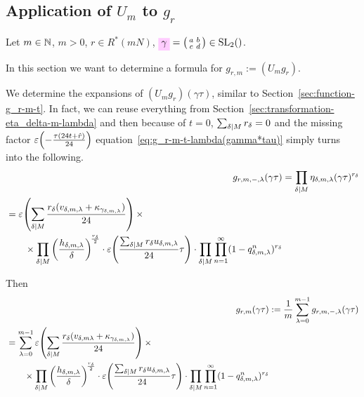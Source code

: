 \documentclass{article}
\begin{document}
\subsection{Application of $U_m$ to $g_{r}$}

Let $m \in \mathbb{N}$, $m>0$, $r \in R^*(mN)$,
$\defineNotation[gamma]{\gamma} =
\left(\begin{smallmatrix}a&b\\c&d\end{smallmatrix}\right) \in
\SL2Z$.
%

In this section we want to determine a formula for
$g_{r,m} := (U_m g_r)$.

We determine the expansions of $(U_m g_r)(\gamma\tau)$, similar to
Section~\ref{sec:function-g_r-m-t}.
%
In fact, we can reuse everything from
Section~\ref{sec:transformation-eta_delta-m-lambda} and then because
of $t=0$, $\sum_{\delta \mid M} r_\delta=0$ and the missing factor
$\varepsilon\!\left(-\frac{\tau(24t+\hat{r})}{24}\right)$
equation~\eqref{eq:g_r-m-t-lambda(gamma*tau)} simply turns into the
following.
\begin{align}
  g_{r,m,-,\lambda}(\gamma\tau)
  &=
    \prod_{\delta \mid M}
    \eta_{\delta,m,\lambda}(\gamma\tau)^{r_\delta}\notag\\
  \begin{split}
  &=
  \varepsilon\!\left(
      \sum_{\delta \mid M}\frac{r_\delta(v_{\delta,m,\lambda}
        +
      \kappa_{\gamma_{\delta,m,\lambda}})}{24}\right) \times\\
  & \qquad\times
    \prod_{\delta \mid M}
    \left(\frac{h_{\delta,m,\lambda}}{\delta}\right)^{\!\frac{r_\delta}{2}}
    \cdot
    \varepsilon\!\left(\frac{\sum_{\delta \mid M} r_\delta u_{\delta,m,\lambda}}{24} \tau\right)
    \cdot
    \prod_{\delta \mid M}
    \prod_{n=1}^\infty (1-q_{\delta,m,\lambda}^n)^{r_\delta}
  \end{split}
  \label{eq:g_r-m---lambda(gamma*tau)}
\end{align}

Then
\begin{align}
  g_{r,m}(\gamma\tau)
  &:=\frac{1}{m} \sum_{\lambda=0}^{m-1} g_{r,m,-,\lambda}(\gamma\tau)\notag\\
  \begin{split}
  &=
    \sum_{\lambda=0}^{m-1}
    \varepsilon\!\left(\sum_{\delta \mid M}\frac{r_\delta(v_{\delta,m\lambda} +
    \kappa_{\gamma_{\delta,m,\lambda}})}{24}\right) \times\\
  & \qquad\times
    \prod_{\delta \mid M}
    \left(\frac{h_{\delta,m,\lambda}}{\delta}\right)^{\!\frac{r_\delta}{2}}
    \cdot
    \varepsilon\!\left(\frac{\sum_{\delta \mid M} r_\delta u_{\delta,m,\lambda}}{24}\tau\right)
    \cdot
    \prod_{\delta \mid M}
    \prod_{n=1}^\infty (1-q_{\delta,m,\lambda}^n)^{r_\delta}
  \end{split}
  \label{eq:g_r-m(gamma*tau)}
\end{align}
\end{document}
